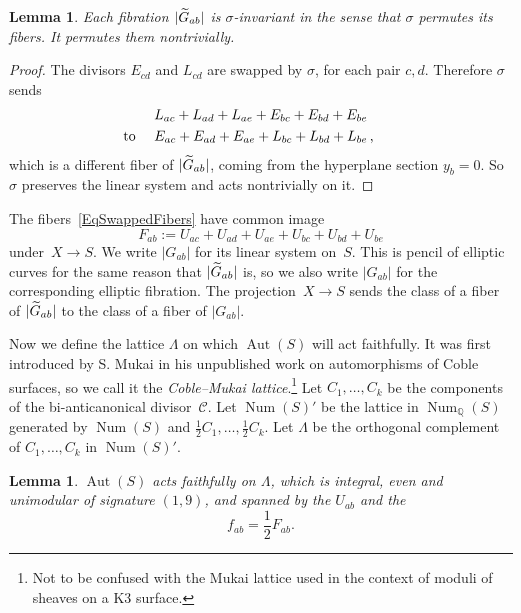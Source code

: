 \documentclass[11pt]{article}
\newtheorem{lemm}[theo]{Lemma}
\theoremstyle{definition}
\numberwithin{equation}{section}
\numberwithin{figure}{section}
\numberwithin{table}{section}
\let\oldtilde\tilde
\renewcommand*\tilde[1]{\mathchoice{\widetilde{#1}}{\widetilde{#1}}{\oldtilde{#1}}{\oldtilde{#1}}}
\newcommand*\Gtilde{\tilde G}
\newcommand*\Q{\mathbb{Q}}
\DeclareMathOperator{\Aut}{Aut}
\DeclareMathOperator{\Num}{Num}
\newcommand{\half}{\frac{1}{2}}
\newcommand{\calC}{\mathcal{C}}
\begin{document}
\begin{lemm}\label{LemFibrationCremonaInvariant}
Each fibration $|\Gtilde_{ab}|$ is $\sigma$-invariant in the sense that $\sigma$ permutes its fibers. It permutes them nontrivially.
\end{lemm}

\begin{proof}
The divisors $E_{cd}$ and $L_{cd}$ are swapped by $\sigma$, for each pair $c,d$. Therefore $\sigma$ sends
\begin{equation}\label{EqSwappedFibers}
\begin{split}
L_{ac}+L_{ad}+L_{ae}+E_{bc}+E_{bd}+E_{be}
\\
\llap{\text{to} \quad}E_{ac}+E_{ad}+E_{ae}+L_{bc}+L_{bd}+L_{be}\rlap{\,,}
\end{split}
\end{equation}
which is a different fiber of $|\Gtilde_{ab}|$, coming from the hyperplane section $y_b=0$. So $\sigma$ preserves the linear system and acts nontrivially on it.
\end{proof}

The fibers~\eqref{EqSwappedFibers} have common image
\begin{equation*}
F_{ab}:= U_{ac}+U_{ad}+U_{ae}+U_{bc}+U_{bd}+U_{be}
\end{equation*}
under~$X\to S$. We write $|G_{ab}|$ for its linear system on~$S$. This is pencil of elliptic curves for the same reason that $|\Gtilde_{ab}|$ is, so we also write $|G_{ab}|$ for the corresponding elliptic fibration. The projection~$X\to S$ sends the class of a fiber of $|\Gtilde_{ab}|$ to the class of a fiber of $|G_{ab}|$.

Now we define the lattice $\Lambda$ on which $\Aut(S)$ will act faithfully. It was first introduced by S. Mukai in his unpublished work on automorphisms of Coble surfaces, so we call it the \emph{Coble--Mukai lattice}.\footnote{Not to be confused with the Mukai lattice used in the context of moduli of sheaves on a K3 surface.} Let $C_1,\dots,C_k$ be the components of the bi-anticanonical divisor~$\calC$. Let $\Num(S)'$ be the lattice in $\Num_\Q(S)$ generated by $\Num(S)$ and $\frac12C_1,\dots,\frac12C_k$. Let $\Lambda$ be the orthogonal complement of $C_1,\dots,C_k$ in $\Num(S)'$.

\begin{lemm}\label{LemFaithful}
$\Aut(S)$ acts faithfully on $\Lambda$, which is integral, even and unimodular of signature $(1,9)$, and spanned by the $U_{ab}$ and the
\begin{equation}\label{Eqfab}
\textstyle f_{ab}=\half F_{ab}.
\end{equation}
\end{lemm}
\end{document}
